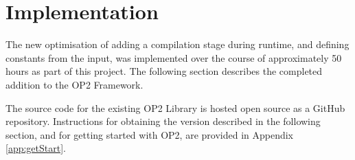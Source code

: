 
\section{Implementation}
\label{s:impl}
\vspace{-2cm}
The new optimisation of adding a compilation stage during runtime, and defining constants from the input, was implemented over the course of approximately 50 hours as part of this project. The following section describes the completed addition to the OP2 Framework.

The source code for the existing OP2 Library is hosted open source as a GitHub\cite{OP2rep} repository. Instructions for obtaining the version described in the following section, and for getting started with OP2, are provided in Appendix \ref{app:getStart}.
